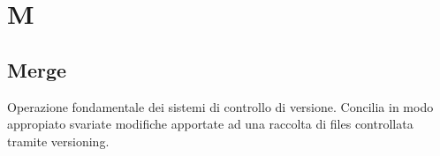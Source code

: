 \section*{M}

\subsection{Merge} 
Operazione fondamentale dei sistemi di controllo di versione. Concilia in modo appropiato svariate modifiche apportate ad una raccolta di files controllata tramite versioning.
